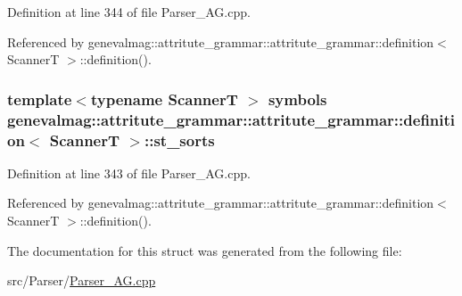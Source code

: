 Definition at line 344 of file Parser\_\-AG.cpp.

Referenced by genevalmag::attritute\_\-grammar::attritute\_\-grammar::definition$<$ ScannerT $>$::definition().\hypertarget{structgenevalmag_1_1attritute__grammar_1_1definition_58b539266c2c03a187a9c8e479ba197d}{
\subsubsection[{st\_\-sorts}]{\setlength{\rightskip}{0pt plus 5cm}template$<$typename ScannerT $>$ symbols genevalmag::attritute\_\-grammar::attritute\_\-grammar::definition$<$ ScannerT $>$::{\bf st\_\-sorts}}}
\label{structgenevalmag_1_1attritute__grammar_1_1definition_58b539266c2c03a187a9c8e479ba197d}




Definition at line 343 of file Parser\_\-AG.cpp.

Referenced by genevalmag::attritute\_\-grammar::attritute\_\-grammar::definition$<$ ScannerT $>$::definition().

The documentation for this struct was generated from the following file:\begin{CompactItemize}
\item 
src/Parser/\hyperlink{Parser__AG_8cpp}{Parser\_\-AG.cpp}\end{CompactItemize}
